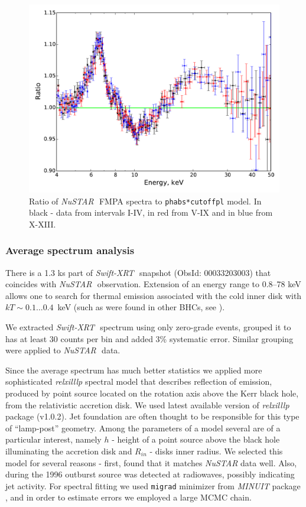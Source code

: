 \documentclass[a4paper,fleqn,usenatbib]{mnras}
\def\swiftx{{\em Swift-XRT\,}}
\def\nustar{{\em NuSTAR\,}}
\begin{document}
\begin{figure}
\centerline{\includegraphics[width=\linewidth]{ratios_v01.pdf}}
\caption{Ratio of \nustar\, FMPA spectra to \texttt{phabs*cutoffpl} model. In black - data from intervals I-IV, in red from V-IX and in blue from X-XIII.} 
\label{fig:ratios}
\end{figure}  

            
\subsubsection{Average spectrum analysis}
\label{sec:spec}            
There is a 1.3 ks part of \swiftx\, snapshot (ObsId: 00033203003) that coincides with \nustar\, observation. 
Extension of an energy range to 0.8--78 keV allows one to search for thermal emission associated with the cold inner disk with $kT \sim 0.1...0.4$~keV (such as were found in other BHCs, see \cite[][ e.t.c]{miller06b,miller06a,parker15}).

We extracted \swiftx\, spectrum using only zero-grade events, grouped it to has at least 30 counts per bin and added 3\% systematic error. 
Similar grouping were applied to \nustar\, data. 

Since the average spectrum has much better statistics we applied more sophisticated {\it relxilllp} spectral model that describes reflection of emission, produced by point source located on the rotation axis above the Kerr black hole, from the relativistic accretion disk. 
We used latest available version of {\it relxilllp} package (v1.0.2).
Jet foundation are often thought to be responsible for this type of ``lamp-post'' geometry. 
Among the parameters of a model several are of a particular interest, namely $h$ - height of a point source above the black hole illuminating the accretion disk and $R_{in}$ - disks inner radius.  
We selected this model for several reasons - first, \cite{miller15_nust} found that it matches {\it NuSTAR} data well. 
Also, during the 1996 outburst source was detected at radiowaves, possibly indicating jet activity. 
For spectral fitting we used \texttt{migrad} minimizer from {\em MINUIT} package \citep{james75minuit}, and in order to estimate errors we employed a large MCMC chain. 
\end{document}
